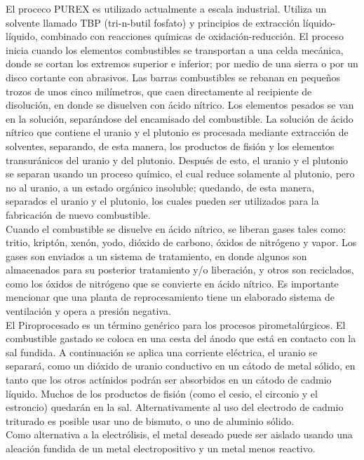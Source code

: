 \documentclass[]{article}
\begin{document}
El proceco PUREX es utilizado actualmente a escala industrial. Utiliza un solvente llamado TBP (tri-n-butil fosfato) y principios de extracción líquido-líquido, combinado con reacciones químicas de oxidación-reducción. El proceso inicia cuando los elementos combustibles se transportan a una celda mecánica, donde se cortan los extremos superior e inferior; por medio de una sierra o por un disco cortante con abrasivos. Las barras combustibles se rebanan en pequeños trozos de unos cinco milímetros, que caen directamente al recipiente de disolución, en donde se disuelven con ácido nítrico. Los elementos pesados se van en la solución, separándose del encamisado del combustible. La solución de ácido nítrico que contiene el uranio y el plutonio es procesada mediante extracción de solventes, separando, de esta manera, los productos de fisión y los elementos transuránicos del uranio y del plutonio. Después de esto, el uranio y el plutonio se separan usando un proceso químico, el cual reduce solamente al plutonio, pero no al uranio, a un estado orgánico insoluble; quedando, de esta manera, separados el uranio y el plutonio, los cuales pueden ser utilizados para la fabricación de nuevo combustible.\\

Cuando el  combustible se disuelve en ácido nítrico, se liberan gases tales como: tritio, kriptón, xenón, yodo, dióxido de carbono, óxidos de nitrógeno y vapor. Los gases son enviados a un sistema de tratamiento, en donde algunos son almacenados para su posterior tratamiento y/o liberación, y otros son reciclados, como los óxidos de nitrógeno que se convierte en ácido nítrico. Es importante mencionar que una planta de reprocesamiento tiene un elaborado sistema de ventilación y opera a presión negativa.\\

El Piroprocesado es un término genérico para los procesos pirometalúrgicos. El combustible gastado se coloca en una cesta del ánodo que está en contacto con la sal fundida. A continuación se aplica una corriente eléctrica, el uranio se separará, como un dióxido de uranio conductivo en un cátodo de metal sólido, en tanto que los otros actínidos podrán ser absorbidos en un cátodo de cadmio líquido. Muchos de los productos de fisión (como el cesio, el circonio y el estroncio) quedarán en la sal. Alternativamente al uso del electrodo de cadmio triturado es posible usar uno de bismuto, o uno de aluminio sólido.\\

Como alternativa a la electrólisis, el metal deseado puede ser aislado usando una aleación fundida de un metal electropositivo y un metal menos reactivo.\\
\end{document}
